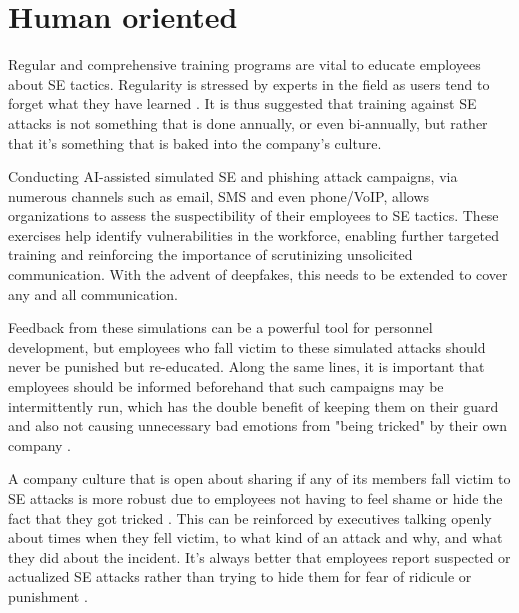 

\section{Human oriented}
\begin{comment}
    
    - The best defense against SE attacks is an educated, conscious user
    - User education should be continuous and not a one-off event

\end{comment}

Regular and comprehensive training programs are vital to educate employees about SE tactics. Regularity is stressed by experts in the field as users tend to forget what they have learned \citep{hadnagySocialEngineering2018, mitnickArtDeceptionControlling2003}. It is thus suggested that training against SE attacks is not something that is done annually, or even bi-annually, but rather that it's something that is baked into the company's culture.

Conducting AI-assisted simulated SE and phishing attack campaigns, via numerous channels such as email, SMS and even phone/VoIP, allows organizations to assess the suspectibility of their employees to SE tactics. These exercises help identify vulnerabilities in the workforce, enabling further targeted training and reinforcing the importance of scrutinizing unsolicited communication. With the advent of deepfakes, this needs to be extended to cover any and all communication.

Feedback from these simulations can be a powerful tool for personnel development, but employees who fall victim to these simulated attacks should never be punished but re-educated. Along the same lines, it is important that employees should be informed beforehand that such campaigns may be intermittently run, which has the double benefit of keeping them on their guard and also not causing unnecessary bad emotions from "being tricked" by their own company \citep{hadnagySocialEngineering2018, mitnickArtDeceptionControlling2003}.

A company culture that is open about sharing if any of its members fall victim to SE attacks is more robust due to employees not having to feel shame or hide the fact that they got tricked \citep{hadnagySocialEngineering2018}. This can be reinforced by executives talking openly about times when they fell victim, to what kind of an attack and why, and what they did about the incident. It's always better that employees report suspected or actualized SE attacks rather than trying to hide them for fear of ridicule or punishment \citep{mitnickArtDeceptionControlling2003}.

